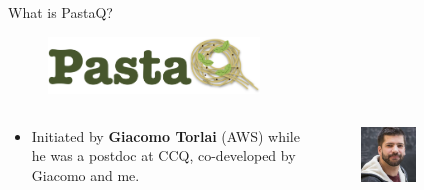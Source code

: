 \begin{frame}{What is PastaQ?}

\begin{figure}[T]
  \includegraphics[width=0.5\textwidth]{
    slides/assets/what-is-pastaq-pastaq.jpg
  }
\end{figure}

\begin{columns}

  \setlength{\partopsep}{0pt}%

  \begin{column}[T]{0.65\textwidth}%

    \begin{itemize}[<+->]

      \item Initiated by \textbf{Giacomo Torlai} (AWS) while he was a postdoc at CCQ, co-developed by Giacomo and me.

    \end{itemize}

  \end{column}

  \begin{column}[T]{0.35\textwidth}%

    \vspace*{-0.4cm}

    \begin{figure}[T]
      \includegraphics[width=0.5\textwidth]{
        slides/assets/what-is-pastaq-giacomo-torlai.jpg
      }
    \end{figure}

  \end{column}


\end{columns}
\end{frame}
